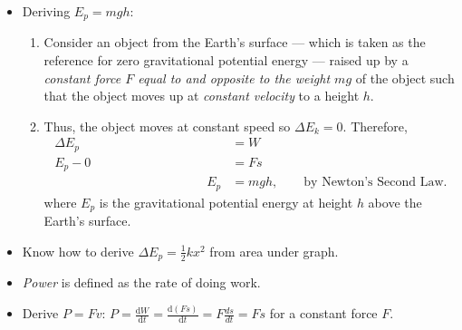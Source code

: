 \documentclass[oneside]{book}
\begin{document}
\begin{itemize}
    \item Deriving \(E_p=mgh\):
    \begin{enumerate}
        \item Consider an object from the Earth's surface --- which is taken as the reference for zero gravitational potential energy --- raised up by a \emph{constant force \(F\) equal to and opposite to the weight \(mg\)} of the object such that the object moves up at \emph{constant velocity} to a height \(h\). 
        \item Thus, the object moves at constant speed so \(\Delta E_k=0\). Therefore, 
        \begin{align*}
            \Delta E_p&= W\\
            E_p-0&=Fs\\
            \qquad\qquad\qquad\qquad\qquad\qquad
            E_p&=mgh, \qquad\text{by Newton's Second Law.}
        \end{align*}
        where \(E_p\) is the gravitational potential energy at height \(h\) above the Earth's surface.
    \end{enumerate}
    \item Know how to derive \(\Delta E_p=\frac{1}{2}kx^2\) from area under graph.
    \item \emph{Power} is defined as the rate of doing work.
    \item Derive \(P=Fv\): \(P=\frac{\text{d}W}{\text{d}t}=\frac{\text{d}(Fs)}{\text{d}t}=F\frac{ds}{dt}=Fs\) for a constant force \(F\).
\end{itemize}
\end{document}
